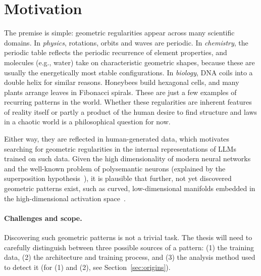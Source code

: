\documentclass[11pt,a4paper]{article}
\newcommand{\fromclaude}[1]{\textcolor{orange!85!black}{#1}}
\newcommand{\fromclaude}[1]{#1}
\begin{document}
\section{Motivation}
The premise is simple: geometric regularities appear across many scientific domains.
In \emph{physics}, rotations, orbits and waves are periodic.
In \emph{chemistry}, the periodic table reflects
the periodic recurrence of element properties, and molecules (e.g., water) take on characteristic geometric shapes, because these are usually the energetically most stable configurations. In \emph{biology}, DNA coils into a double
helix for similar reasons. Honeybees build hexagonal cells, and many plants arrange leaves in
Fibonacci spirals. These are just a few examples of recurring patterns in the
world.
Whether these regularities are inherent features of reality itself or partly a product of the human desire to find structure and laws in a chaotic world is a philosophical question for now.

Either way, they are reflected in human-generated data, which motivates searching for geometric regularities in the internal representations of LLMs trained on such data.
Given the high dimensionality of modern neural networks and the well-known problem of polysemantic neurons (explained by the superposition hypothesis~\cite{elhage2022toy}), it is plausible that further, not yet discovered geometric patterns exist, such as curved, low-dimensional manifolds embedded in the high-dimensional activation space\fromclaude{~\cite{engels2025notall,modell2025origins,gurnee2025manifolds}}.

\paragraph{Challenges and scope.}
Discovering such geometric patterns is not a trivial task. The thesis will need to carefully distinguish between three possible sources of a pattern: (1) the training data, (2) the architecture and training process, and (3) the analysis method used to detect it \fromclaude{(for (1) and (2), see Section~\ref{sec:origins})}.
\end{document}
